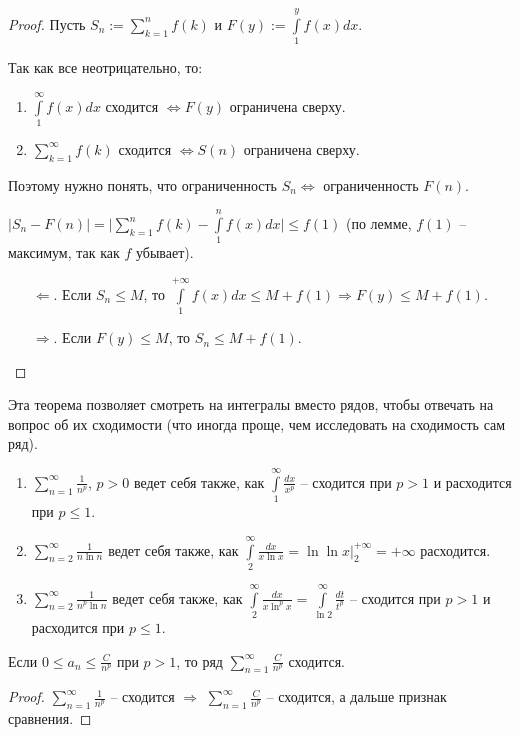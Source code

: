 \begin{proof}
    Пусть $S_n:=\sum\limits_{k=1}^n f(k)$ и $F(y):=\int\limits_1^y f(x)dx$.

    Так как все неотрицательно, то:
    
    \begin{enumerate}
        \item $\int\limits_1^\infty f(x)dx$ сходится $\Leftrightarrow F(y)$ ограничена сверху.
        \item $\sum\limits_{k=1}^\infty f(k)$ сходится $\Leftrightarrow S(n)$ ограничена сверху.
    \end{enumerate}

    Поэтому нужно понять, что ограниченность $S_n\Leftrightarrow$ ограниченность $F(n)$.

    $|S_n-F(n)|=\bigg|\sum\limits_{k=1}^n f(k)-\int\limits_1^n f(x)dx\bigg|\leq f(1)$ (по лемме, $f(1)$ – максимум, так как $f$ убывает).

    \begin{enumerate}
        \item[$\Leftarrow$.] Если $S_n\leq M$, то $\int\limits_1^{+\infty}f(x)dx\leq M+f(1)\Rightarrow F(y)\leq M+f(1)$.
        \item[$\Rightarrow$.] Если $F(y)\leq M$, то $S_n\leq M+f(1)$.
    \end{enumerate}
\end{proof}

\begin{example}
    Эта теорема позволяет смотреть на интегралы вместо рядов, чтобы отвечать на вопрос об их сходимости (что иногда проще, чем исследовать на сходимость сам ряд).
    \begin{enumerate}
        \item $\sum\limits_{n=1}^\infty \frac{1}{n^p}$, $p>0$ ведет себя также, как $\int\limits_1^\infty \frac{dx}{x^p}$ – сходится при $p>1$ и расходится при $p\leq 1$.
        \item $\sum\limits_{n=2}^\infty \frac{1}{n\ln n}$ ведет себя также, как $\int\limits_2^\infty \frac{dx}{x\ln x}=\ln \ln x|_2^{+\infty}=+\infty$ расходится.
        \item $\sum\limits_{n=2}^\infty \frac{1}{n^p\ln n}$ ведет себя также, как $\int\limits_2^\infty \frac{dx}{x\ln^p x}=\int\limits_{\ln 2}^\infty\frac{dt}{t^p}$ – сходится при $p>1$ и расходится при $p\leq 1$.
    \end{enumerate}
\end{example}

\begin{corollary}
    Если $0\leq a_n \leq \frac{C}{n^p}$ при $p>1$, то ряд $\sum\limits_{n=1}^{\infty}\frac{C}{n^p}$ сходится.
\end{corollary}
\begin{proof}
    $\sum\limits_{n=1}^{\infty}\frac{1}{n^p}$ – сходится $\Rightarrow$ $\sum\limits_{n=1}^{\infty}\frac{C}{n^p}$ – сходится, а дальше признак сравнения.
\end{proof}

